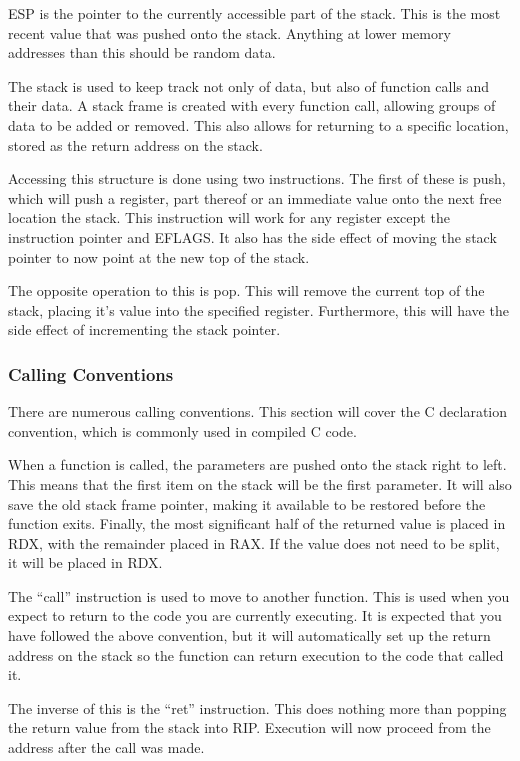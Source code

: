 				ESP is the pointer to the currently accessible part of the stack. 
				This is the most recent value that was pushed onto the stack. 
				Anything at lower memory addresses than this should be random data. 
				
				The stack is used to keep track not only of data, but also of function calls and their data. 
				A stack frame is created with every function call, allowing groups of data to be added or removed. 
				This also allows for returning to a specific location, stored as the return address on the stack. 

				Accessing this structure is done using two instructions. 
				The first of these is push, which will push a register, part thereof or an immediate value onto the next free location the stack. 
				This instruction will work for any register except the instruction pointer and EFLAGS. 
				It also has the side effect of moving the stack pointer to now point at the new top of the stack. 

				The opposite operation to this is pop. 
				This will remove the current top of the stack, placing it's value into the specified register. 
				Furthermore, this will have the side effect of incrementing the stack pointer. 

			\subsubsection{Calling Conventions}
				There are numerous calling conventions. 
				This section will cover the C declaration convention, which is commonly used in compiled C code. 

				When a function is called, the parameters are pushed onto the stack right to left. 
				This means that the first item on the stack will be the first parameter. 
				It will also save the old stack frame pointer, making it available to be restored before the function exits. 
				Finally, the most significant half of the returned value is placed in RDX, with the remainder placed in RAX. 
				If the value does not need to be split, it will be placed in RDX. 

				The ``call'' instruction is used to move to another function. 
				This is used when you expect to return to the code you are currently executing.
				It is expected that you have followed the above convention, but it will automatically set up the return address on the stack so the function can return execution to the code that called it. 

				The inverse of this is the ``ret'' instruction. 
				This does nothing more than popping the return value from the stack into RIP. 
				Execution will now proceed from the address after the call was made. 

